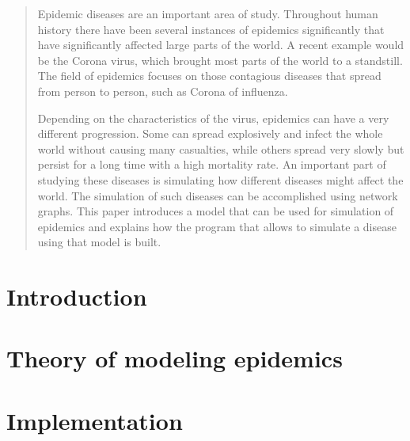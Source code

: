 \documentclass[oneside]{ausarbeitung}
\begin{document}
\begin{abstract}
 Epidemic diseases are an important area of study. Throughout human history there
 have been several instances of epidemics significantly that have significantly affected large parts of the world.
 A recent example would be the Corona virus, which brought most parts of the world to a 
 standstill. The field of epidemics focuses on those contagious diseases that spread from
 person to person, such as Corona of influenza.

 Depending on the characteristics of the virus, epidemics can have a very different progression.
 Some can spread explosively and infect the whole world without causing many casualties, while others
 spread very slowly but persist for a long time with a high mortality rate. An important 
 part of studying these diseases is simulating how different diseases might affect the world.
 The simulation of such diseases can be accomplished using network graphs. This paper introduces
 a model that can be used for simulation of epidemics and explains how the program that allows to simulate a disease using that model is built.
\end{abstract}
\cleardoublepage
\tableofcontents

\listoffigures



\cleardoublepage
{}
\setcounter{page}{1}

\algrenewcommand{}
\algrenewcommand{}


\chapter{Introduction}
\label{cha:introduction}


\chapter{Theory of modeling epidemics}
\label{cha:general_principles}


\chapter{Implementation}
\label{cha:implementation}

\end{document}
